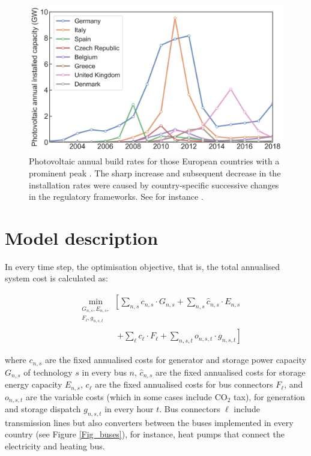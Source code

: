 \documentclass[3p]{elsarticle} %
\begin{document}
\begin{figure}[!h]
\centering
\includegraphics[width=12cm]{figures/installation_rates_PV.png}
\caption{Photovoltaic annual build rates for those European countries with a prominent peak \cite{IRENA_2019}. The sharp increase and subsequent decrease in the installation rates were caused by country-specific successive changes in the regulatory frameworks. See for instance \cite{Report_Fraunhofer_2019, Victoria_2012}. } \label{fig_installation_rates_PV} 
\end{figure}
 
\FloatBarrier

\section{Model description}

In every time step, the optimisation objective, that is, the total annualised system cost is calculated as:

\begin{align}
& \min_{\substack{G_{n,s},E_{n,s},\\F_\ell,g_{n,s,t}}} \left[ \sum_{n,s} c_{n,s} \cdot G_{n,s} +\sum_{n,s} \hat{c}_{n,s} \cdot E_{n,s} \right. \nonumber \\
& \hspace{2cm} \left. + \sum_{\ell} c_{\ell} \cdot F_{\ell}+ \sum_{n,s,t} o_{n,s,t} \cdot g_{n,s,t} \right]
\label{eq_objective}
\end{align}

where $c_{n,s}$ are the fixed annualised costs for generator and storage power capacity $G_{n,s}$ of technology $s$ in every bus $n$, $\hat{c}_{n,s}$ are the fixed annualised costs for storage energy capacity $E_{n,s}$, $c_\ell$ are the fixed annualised costs for bus connectors $F_{\ell}$, and $o_{n,s,t}$ are the variable costs (which in some cases include CO$_2$ tax), for generation and storage dispatch $g_{n,s,t}$ in every hour $t$. Bus connectors $\ell$ include transmission lines but also converters between the buses implemented in every country (see Figure \ref{Fig_buses}), for instance, heat pumps that connect the electricity and heating bus. \\
\end{document}
